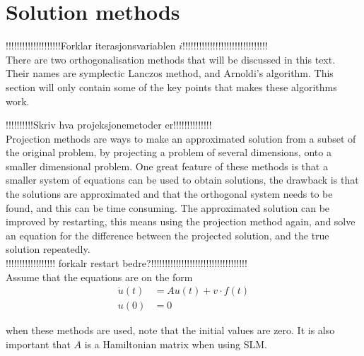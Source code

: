 \section{Solution methods}
!!!!!!!!!!!!!!!!!!!!Forklar iterasjonsvariablen $i$!!!!!!!!!!!!!!!!!!!!!!!!!!!!!!!\\
There are two orthogonalisation methods that will be discussed in this text. Their names are symplectic Lanczos method, and Arnoldi's algorithm. This section will only contain some of the key points that makes these algorithms work.  %


!!!!!!!!!!Skriv hva projeksjonemetoder er!!!!!!!!!!!!!!\\
Projection methods are ways to make an approximated solution from a subset of the original problem, by projecting a problem of several dimensions, onto a smaller dimensional problem. One great feature of these methods is that a smaller system of equations can be used to obtain solutions, the drawback is that the solutions are approximated and that the orthogonal system needs to be found, and this can be time consuming. The approximated solution can be improved by restarting, this means using the projection method again, and solve an equation for the difference between the projected solution, and the true solution repeatedly.\\
!!!!!!!!!!!!!!!!!! forkalr restart bedre?!!!!!!!!!!!!!!!!!!!!!!!!!!!!!!!!!!!\\

Assume that the equations are on the form
\begin{equation}
\begin{aligned}
\dot{u}(t) &= Au(t) + v \cdot f(t) \\
u(0) &= 0
\end{aligned}
\label{eqn:PMform}
\end{equation}

when these methods are used, note that the initial values are zero. It is also important that $A$ is a Hamiltonian matrix when using SLM. \\

